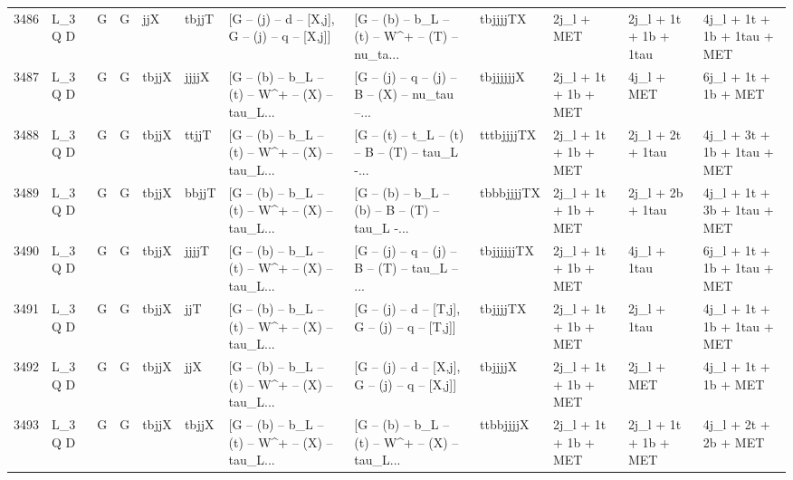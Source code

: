 \begin{tabular}{llllllllllll}
3486 &      L\_3 Q D &     G &     G &         jjX &       tbjjT &   [G -- (j) -- d -- [X,j], G -- (j) -- q -- [X,j]] &  [G -- (b) -- b\_L -- (t) -- W\textasciicircum + -- (T) -- nu\_ta... &    tbjjjjTX &               2j\_l + MET &    2j\_l + 1t + 1b + 1tau &        4j\_l + 1t + 1b + 1tau + MET \\
3487 &      L\_3 Q D &     G &     G &       tbjjX &       jjjjX &  [G -- (b) -- b\_L -- (t) -- W\textasciicircum + -- (X) -- tau\_L... &  [G -- (j) -- q -- (j) -- B -- (X) -- nu\_tau --... &   tbjjjjjjX &     2j\_l + 1t + 1b + MET &               4j\_l + MET &               6j\_l + 1t + 1b + MET \\
3488 &      L\_3 Q D &     G &     G &       tbjjX &       ttjjT &  [G -- (b) -- b\_L -- (t) -- W\textasciicircum + -- (X) -- tau\_L... &  [G -- (t) -- t\_L -- (t) -- B -- (T) -- tau\_L -... &  tttbjjjjTX &     2j\_l + 1t + 1b + MET &         2j\_l + 2t + 1tau &        4j\_l + 3t + 1b + 1tau + MET \\
3489 &      L\_3 Q D &     G &     G &       tbjjX &       bbjjT &  [G -- (b) -- b\_L -- (t) -- W\textasciicircum + -- (X) -- tau\_L... &  [G -- (b) -- b\_L -- (b) -- B -- (T) -- tau\_L -... &  tbbbjjjjTX &     2j\_l + 1t + 1b + MET &         2j\_l + 2b + 1tau &        4j\_l + 1t + 3b + 1tau + MET \\
3490 &      L\_3 Q D &     G &     G &       tbjjX &       jjjjT &  [G -- (b) -- b\_L -- (t) -- W\textasciicircum + -- (X) -- tau\_L... &  [G -- (j) -- q -- (j) -- B -- (T) -- tau\_L -- ... &  tbjjjjjjTX &     2j\_l + 1t + 1b + MET &              4j\_l + 1tau &        6j\_l + 1t + 1b + 1tau + MET \\
3491 &      L\_3 Q D &     G &     G &       tbjjX &         jjT &  [G -- (b) -- b\_L -- (t) -- W\textasciicircum + -- (X) -- tau\_L... &   [G -- (j) -- d -- [T,j], G -- (j) -- q -- [T,j]] &    tbjjjjTX &     2j\_l + 1t + 1b + MET &              2j\_l + 1tau &        4j\_l + 1t + 1b + 1tau + MET \\
3492 &      L\_3 Q D &     G &     G &       tbjjX &         jjX &  [G -- (b) -- b\_L -- (t) -- W\textasciicircum + -- (X) -- tau\_L... &   [G -- (j) -- d -- [X,j], G -- (j) -- q -- [X,j]] &     tbjjjjX &     2j\_l + 1t + 1b + MET &               2j\_l + MET &               4j\_l + 1t + 1b + MET \\
3493 &      L\_3 Q D &     G &     G &       tbjjX &       tbjjX &  [G -- (b) -- b\_L -- (t) -- W\textasciicircum + -- (X) -- tau\_L... &  [G -- (b) -- b\_L -- (t) -- W\textasciicircum + -- (X) -- tau\_L... &   ttbbjjjjX &     2j\_l + 1t + 1b + MET &     2j\_l + 1t + 1b + MET &               4j\_l + 2t + 2b + MET \\

\end{tabular}
